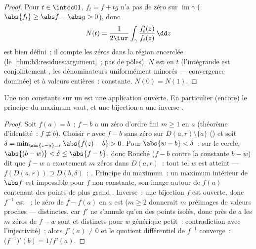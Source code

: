 \begin{proof}
Pour $t \in \intcc01$, $f_t = f + tg$ n'a pas de zéro sur
$\operatorname{im}\gamma$ ($\abs{f_t} \geq \abs f - \abs g >
0$), donc
\[
N(t) = \frac1{2\iu\pi}\int_\gamma
\frac{f_t'(z)}{f_t(z)}\,\dd z
\]
est bien défini~; il compte les zéros dans la région
encerclée (le~\cref{thm:b3:residues:argument}~; pas de pôles).
$N$ est  en $t$ (l'intégrande est conjointement
, les dénominateurs uniformément minorés ---
convergence dominée) et à valeurs entières~: constante.
$N(0) = N(1)$.
\end{proof}

\begin{corollary}
\label{cor:b3:residues:openmapping}
Une  non constante sur un  
est une application ouverte. En particulier (encore) le
principe du maximum vaut, et une bijection  a une
inverse .
\end{corollary}

\begin{proof}
Soit $f(a) = b$~; $f - b$ a un zéro d'ordre fini $m \geq 1$
en $a$ (théorème d'identité~: $f \not\equiv b$). Choisir $r$
avec $f - b$ sans zéro sur $\bar D(a, r)\setminus\{a\}$
() et soit $\delta = \min_{\abs{z - a} =
r}\abs{f(z) - b} > 0$. Pour $\abs{w - b} < \delta$~: sur le
cercle, $\abs{(b - w)} < \delta \leq \abs{f - b}$, donc
Rouché ($f - b$ contre la constante $b - w$) dit que $f - w$
a exactement $m$ zéros dans $D(a, r)$~: tout tel $w$ est
atteint --- $f(D(a,r)) \supseteq D(b, \delta)$~: .
Principe du maximum~: un maximum intérieur de $\abs f$ est
impossible pour $f$ non constante, son image autour de $f(a)$
contenant des points de plus grand . Inverse~: une
bijection  $f$ est ouverte, donc $f^{-1}$ est
~; le zéro de $f - f(a)$ en $a$ est  ($m \geq
2$ donnerait $m$ préimages de valeurs proches --- distinctes,
car $f'$ ne s'annule qu'en des points isolés, donc près de
$a$ les $m$ zéros de $f - w$ sont  et distincts pour
$w$ générique petit~: contradiction avec l'injectivité)~;
alors $f'(a) \neq 0$ et le quotient différentiel de $f^{-1}$
converge~: $\bigl(f^{-1}\bigr)'(b) = 1/f'(a)$.
\end{proof}

